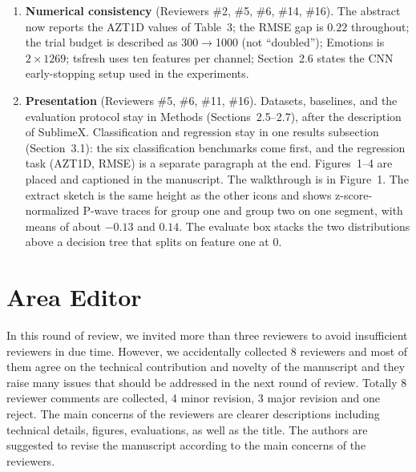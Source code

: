\documentclass[11pt]{article}
\newcommand{\rc}[1]{\begin{reviewerbox}#1\end{reviewerbox}}
\begin{document}
\begin{enumerate}[leftmargin=1.4em]
    Section~3.5 now speak of \emph{traceable feature descriptions}. We state explicitly that
    traceability is not clinical or biological interpretability and that no expert reader study
    was performed. SHAP is shown for REMC, AZT1D, and MIT-BIH (Figure~4), not for the remaining
    datasets.
  \item \textbf{Numerical consistency} (Reviewers \#2, \#5, \#6, \#14, \#16). The abstract now reports
    the AZT1D values of Table~3; the RMSE gap is $0.22$ throughout; the trial budget is described as
    300$\to$1000 (not ``doubled''); Emotions is $2\times1269$; tsfresh uses ten features per channel;
    Section~2.6 states the CNN early-stopping setup used in the experiments.
  \item \textbf{Presentation} (Reviewers \#5, \#6, \#11, \#16). Datasets, baselines, and the
    evaluation protocol stay in Methods (Sections~2.5--2.7), after the description of SublimeX.
    Classification and regression stay in one results subsection (Section~3.1): the six
    classification benchmarks come first, and the regression task (AZT1D, RMSE) is a separate
    paragraph at the end. Figures~1--4 are placed and captioned in the manuscript.
    The walkthrough is in Figure~1. The extract sketch is the same height as the other icons and shows z-score-normalized P-wave traces for group one and group two on one segment, with means of about $-0.13$ and $0.14$. The evaluate box stacks the two distributions above a decision tree that splits on feature one at $0$.
\end{enumerate}

\section*{Area Editor}

\rc{In this round of review, we invited more than three reviewers to avoid insufficient reviewers
in due time. However, we accidentally collected 8 reviewers and most of them agree on the technical
contribution and novelty of the manuscript and they raise many issues that should be addressed in the
next round of review. Totally 8 reviewer comments are collected, 4 minor revision, 3 major revision
and one reject. The main concerns of the reviewers are clearer descriptions including technical
details, figures, evaluations, as well as the title. The authors are suggested to revise the
manuscript according to the main concerns of the reviewers.}
\end{document}
